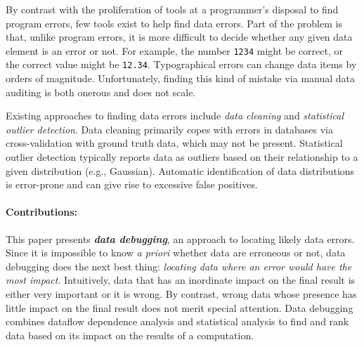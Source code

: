 


By contrast with the proliferation of tools at a programmer's disposal
to find program errors, few tools exist to help find data errors. Part
of the problem is that, unlike program errors, it is more difficult to
decide whether any given data element is an error or not. For example,
the number \texttt{1234} might be correct, or the
correct value might be \texttt{12.34}. Typographical errors 
can change data items by orders of magnitude. Unfortunately, finding this kind of mistake via manual data
auditing is both onerous and does not
scale.



Existing approaches to finding data errors include
\emph{data cleaning} and  \emph{statistical outlier detection}.
Data cleaning primarily copes with errors in databases via
cross-validation with ground truth data, which may not be
present. Statistical outlier detection typically reports data as
outliers based on their relationship to a given distribution (e.g.,
Gaussian).  Automatic identification of data distributions is
error-prone and can give rise to excessive false positives.



\paragraph{Contributions:}
This paper presents \emph{\bf data debugging}, an approach to locating
likely data errors. Since it is impossible to know \emph{a priori}
whether data are erroneous or not, data debugging does the next best
thing: \emph{locating data where an error would have the most
impact}. Intuitively, data that has an inordinate impact on the final
result is either very important or it is wrong. By contrast, wrong
data whose presence has little impact on the final result does not
merit special attention.  Data debugging combines dataflow dependence
analysis and statistical analysis to find and rank data based on its
impact on the results of a computation.

